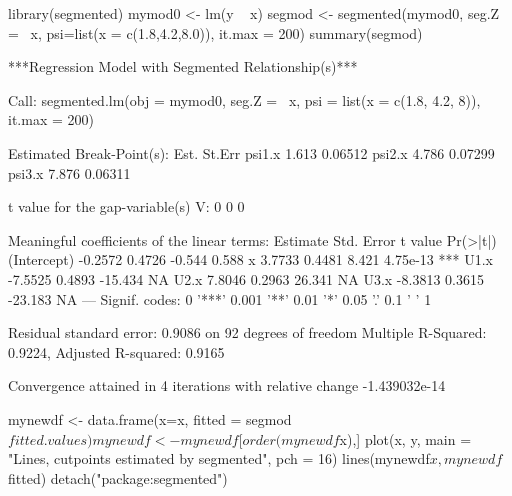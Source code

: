 \begin{Schunk}
\begin{Sinput}
 library(segmented)
 mymod0 <- lm(y ~ x)
 segmod <- segmented(mymod0, seg.Z = ~x, psi=list(x = c(1.8,4.2,8.0)), it.max = 200)
 summary(segmod)
\end{Sinput}
\begin{Soutput}
	***Regression Model with Segmented Relationship(s)***

Call: 
segmented.lm(obj = mymod0, seg.Z = ~x, psi = list(x = c(1.8, 
    4.2, 8)), it.max = 200)

Estimated Break-Point(s):
         Est.  St.Err
psi1.x 1.613 0.06512
psi2.x 4.786 0.07299
psi3.x 7.876 0.06311

t value for the gap-variable(s) V:  0 0 0 

Meaningful coefficients of the linear terms:
            Estimate Std. Error t value Pr(>|t|)    
(Intercept)  -0.2572     0.4726  -0.544    0.588    
x             3.7733     0.4481   8.421 4.75e-13 ***
U1.x         -7.5525     0.4893 -15.434       NA    
U2.x          7.8046     0.2963  26.341       NA    
U3.x         -8.3813     0.3615 -23.183       NA    
---
Signif. codes:  0 '***' 0.001 '**' 0.01 '*' 0.05 '.' 0.1 ' ' 1

Residual standard error: 0.9086 on 92 degrees of freedom
Multiple R-Squared: 0.9224,  Adjusted R-squared: 0.9165 

Convergence attained in 4 iterations with relative change -1.439032e-14 
\end{Soutput}
\begin{Sinput}
 mynewdf <- data.frame(x=x, fitted = segmod$fitted.values)
 mynewdf <- mynewdf[order(mynewdf$x),]
 plot(x, y, main = "Lines, cutpoints estimated by segmented", pch = 16)
 lines(mynewdf$x, mynewdf$fitted)
 detach("package:segmented")
\end{Sinput}
\end{Schunk}
